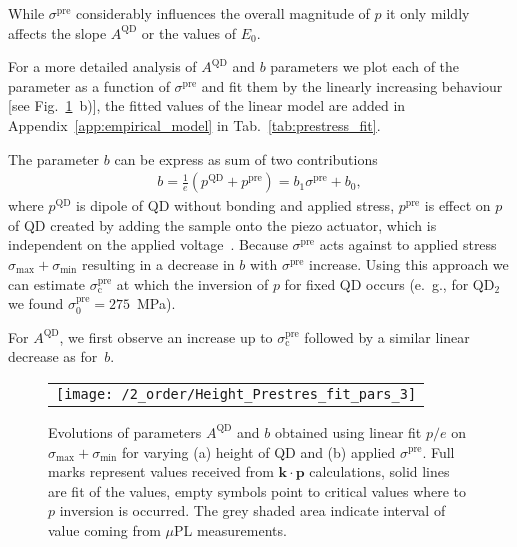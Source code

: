 While $\sigma^{\mathrm{pre}}$ considerably influences the overall magnitude of $p$ it only mildly affects the slope $A^{\mathrm{QD}}$ or the values of $E_0$.
%
%
%

For a more detailed analysis of $A^{\mathrm{QD}}$ and $b$ parameters we plot each of the parameter as a function of $\sigma^{\mathrm{pre}}$ and fit them by the linearly increasing behaviour [see Fig.~\ref{fig:FitHeightPrestress}~b)], the fitted values of the linear model are added in Appendix~\ref{app:empirical_model} in Tab.~\ref{tab:prestress_fit}.

The parameter $b$ can be express as sum of two contributions
\begin{eqnarray}
 b =\frac{1}{e} \left(p^\mathrm{QD} + p^\mathrm{pre} \right)=b_1\sigma^\mathrm{pre} +b_0,
\end{eqnarray} 
where $p^\mathrm{QD}$ is dipole of QD without bonding and applied stress, $p^\mathrm{pre}$ is effect on $p$ of QD created by adding the sample onto the piezo actuator, which is independent on the applied voltage~\cite{Aberl:17}. Because $\sigma^{\mathrm{pre}}$ acts against to applied stress $\sigma_{\mathrm{max}}+\sigma_{\mathrm{min}}$ resulting in a decrease in $b$ with $\sigma^\mathrm{pre}$ increase.
%
%
Using this approach we can estimate $\sigma^\mathrm{pre}_\mathrm{c}$ at which the inversion of $p$ for fixed QD occurs (e.~g., for QD$_2$ we found $\sigma^\mathrm{pre}_\mathrm{0}=275$~MPa).

For $A^{\mathrm{QD}}$, we first observe an increase up to $\sigma^\mathrm{pre}_\mathrm{c}$ followed by a similar linear decrease as for~$b$.




\begin{figure}[!ht]
	\renewcommand{\tabcolsep}{2pt}
	\begin{center}
		\begin{tabular}{c}
			\texttt{[image: /2\_order/Height\_Prestres\_fit\_pars\_3]} \\
		\end{tabular}
	\end{center}
	\caption{Evolutions of parameters $A^{\mathrm{QD}}$ and $b$ obtained using linear fit $p/e$ on $\sigma_{\mathrm{max}}+\sigma_{\mathrm{min}}$ for varying (a) height of QD and (b) applied $\sigma^{\mathrm{pre}}$. Full marks represent values received from $\mathbf{k\cdot p}$ calculations, solid lines are fit of the values, empty symbols point to critical values where to $p$ inversion is occurred. The grey shaded area indicate interval of value coming from $\mu$PL measurements.
		\label{fig:FitHeightPrestress}}
\end{figure}






